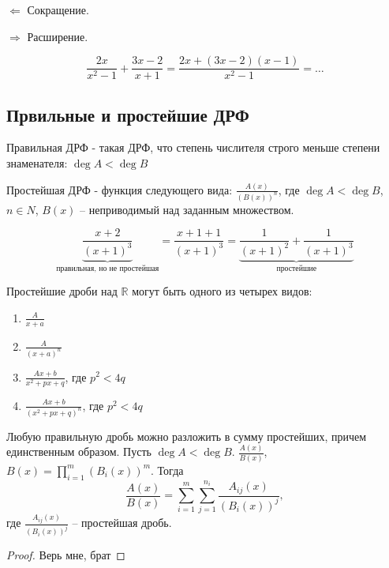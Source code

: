 \documentclass[12pt, a4paper]{article}
\begin{document}
    \( \Leftarrow  \) Сокращение.

    \( \Rightarrow \) Расширение.
    \begin{exmp}
        \[
            \frac{2x}{x^2 - 1} + \frac{3x-2}{x + 1} = \frac{2x + (3x - 2)(x-1)}{x^2 - 1} = \ldots 
        \] 
        
    \end{exmp}
    \subsection{Првильные и простейшие ДРФ}
    \begin{definition}
        Правильная ДРФ - такая ДРФ, что степень числителя строго меньше степени знаменателя: \( \deg A < \deg B \)
    \end{definition}
    \begin{definition}
        Простейшая ДРФ - функция следующего вида: \( \frac{A(x)}{(B(x))^{n} } \), где \( \deg A < \deg B \), \( n \in N \), \( B(x) \) -- неприводимый над заданным множеством.
    \end{definition}
    \begin{exmp}
        \[
            \underbrace{\frac{x + 2}{(x+1)^3 }}_{\text{правильная, но не простейшая}} = \frac{x + 1 + 1}{(x + 1)^3 } = \underbrace{\frac{1}{(x+1)^2} + \frac{1}{(x+1)^3 }}_{\text{простейшие}}
        \] 
    \end{exmp}
    Простейшие дроби над \( \mathbb{R} \) могут быть одного из четырех видов:
    \begin{enumerate}
        \item \( \frac{A}{x + a} \)
        \item \( \frac{A}{(x + a)^{n} } \)
        \item \( \frac{Ax + b}{x^2 + px + q} \), где \( p^2 < 4q \)
        \item \( \frac{Ax + b}{(x^2 + px + q)^{n} } \), где \( p^2 < 4q \)
    \end{enumerate}
    \begin{lem}
        Любую правильную дробь можно разложить в сумму простейших, причем единственным образом.
        Пусть \( \deg A < \deg B \). \( \frac{A(x)}{B(x)}\), \( B(x) = \prod_{i=1}^{m} (B_{i}(x))^{m}    \). Тогда \[
            \frac{A(x)}{B(x)} = \sum_{i=1}^{m} \sum_{j=1}^{n_{i}} \frac{A_{ij}(x)}{(B_{i}(x))^{j}},
        \] где \( \frac{A_{ij}(x)}{(B_{i}(x))^{j}} \) -- простейшая дробь.
    \end{lem}
    \begin{proof}
        Верь мне, брат
    \end{proof}
\end{document}
